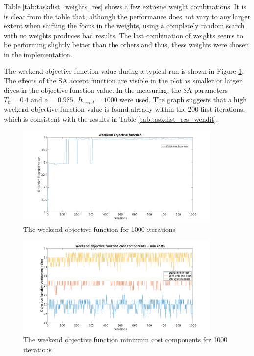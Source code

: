 Table \ref{tab:taskdist_weights_res} shows a few extreme weight combinations. It is is clear from the table that, although the performance does not vary to any larger extent when shifting the focus in the weights, using a completely random search with no weights produces bad results. The last combination of weights seems to be performing slightly better than the others and thus, these weights were chosen in the implementation.

The weekend objective function value during a typical run is shown in Figure \ref{fig:obj_fun_vals}. The effects of the SA accept function are visible in the plot as smaller or larger dives in the objective function value. In the measuring, the SA-parameters $T_0 = 0.4$ and $\alpha = 0.985$. $It_{wend} = 1000$ were used. The graph suggests that a high weekend objective function value is found already within the 200 first iterations, which is consistent with the results in Table \ref{tab:taskdist_res_wendit}.

\begin{figure}[!htbp]
\centering
\includegraphics[width=0.9\textwidth, trim = 100px 0px 100px 20px, clip]{Chapters/ImagesEmelie/Plot_1000_20.png}
\caption{The weekend objective function for 1000 iterations}
\label{fig:obj_fun_vals}
\end{figure}


\begin{figure}[!htbp]
\centering
\includegraphics[width=0.9\textwidth, trim = 100px 0px 100px 20px, clip]{Chapters/ImagesEmelie/Components_1000_20.png}
\caption{The weekend objective function minimum cost components for 1000 iterations}
\label{fig:obj_fun_comp}
\end{figure}

